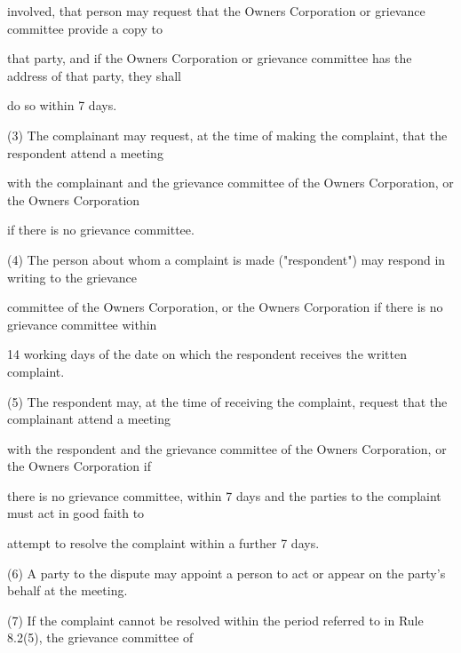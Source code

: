 \documentclass{article}
\begin{document}
\newpage


















{\fontsize{10.02}{1}involved, that person may request that the Owners Corporation or grievance committee provide a copy to }

{\fontsize{10.02}{1}that party, and if the Owners Corporation or grievance committee has the address of that party, they shall }

{\fontsize{10.02}{1}do so within 7 days. }

{\fontsize{9.962}{1}(3) The complainant may request, at the time of making the complaint, that the respondent attend a meeting }

{\fontsize{10.02}{1}with the complainant and the grievance committee of the Owners Corporation, or the Owners Corporation }

{\fontsize{10.02}{1}if there is no grievance committee. }

{\fontsize{9.962}{1}(4) The person about whom a complaint is made ("respondent") may respond in writing to the grievance }

{\fontsize{10.02}{1}committee of the Owners Corporation, or the Owners Corporation if there is no grievance committee within }

{\fontsize{10.02}{1}14 working days of the date on which the respondent receives the written complaint. }

{\fontsize{9.962}{1}(5) The respondent may, at the time of receiving the complaint, request that the complainant attend a meeting }

{\fontsize{10.02}{1}with the respondent and the grievance committee of the Owners Corporation, or the Owners Corporation if }

{\fontsize{10.02}{1}there is no grievance committee, within 7 days and the parties to the complaint must act in good faith to }

{\fontsize{10.02}{1}attempt to resolve the complaint within a further 7 days. }

{\fontsize{9.962}{1}(6) A party to the dispute may appoint a person to act or appear on the party’s behalf at the meeting. }

{\fontsize{9.962}{1}(7) If the complaint cannot be resolved within the period referred to in Rule 8.2(5), the grievance committee of }
\end{document}
